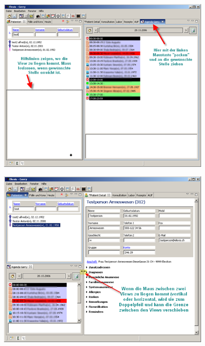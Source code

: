    \includegraphics[width=0.8\textwidth]{images/agendagewaehlt}

   \includegraphics[width=0.8\textwidth]{images/agendaanpassen}

